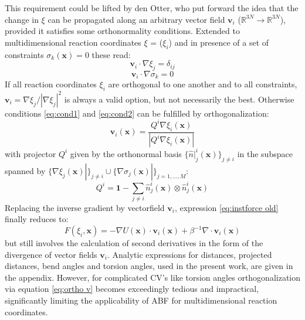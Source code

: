 This requirement could be lifted by den Otter\autocite{den2000thermodynamic}, who put forward the idea that the change in $\xi$ can be propagated along an arbitrary vector field $\textbf{v}_i$ ($\mathbb{R}^{3N} \to \mathbb{R}^{3N}$), provided it satisfies some orthonormality conditions.
Extended to multidimensional reaction coordinates \textbf{$\xi$} = ($\xi_i$) and in presence of a set of constraints $\sigma_{k}(\textbf{x})=0$ these read:\autocite{ciccotti2005blue}
\begin{equation}
  \textbf{v}_i \cdot \nabla \xi_j = \delta_{ij} \label{eq:cond1}
\end{equation}
\begin{equation}
  \textbf{v}_i \cdot \nabla \sigma_k = 0 \label{eq:cond2}
\end{equation}
If all reaction coordinates $\xi_i$ are orthogonal to one another and to all constraints, $\textbf{v}_i = \nabla \xi_j/|\nabla \xi_j|^2$ is always a valid option, but not necessarily the best.
Otherwise conditions \ref{eq:cond1} and \ref{eq:cond2} can be fulfilled by orthogonalization:\autocite{ciccotti2005blue}
\begin{equation}
  \textbf{v}_i (\textbf{x}) = \frac{Q^i \nabla \xi_i (\textbf{x})}{|Q^i \nabla \xi_i (\textbf{x})|} \label{eq:ortho v}
\end{equation}
with projector $Q^i$ given by the orthonormal basis $\{\hat{n}|_{j}^{i}(\textbf{x})\}_{j\neq i}$ in the subspace spanned by $\{\nabla \xi_j (\textbf{x})|\}_{j\neq i} \cup \{\nabla\sigma_j (\textbf{x})|\}_{j=1,...,M}$:
\begin{equation}
  Q^i = \textbf{1} - \sum_{j \neq i} \hat{n}_{j}^{i}(\textbf{x}) \otimes \hat{n}_{j}^{i}(\textbf{x})
\end{equation}
Replacing the inverse gradient by vectorfield $\textbf{v}_i$, expression \ref{eq:instforce old} finally reduces to:
\begin{equation}
  F(\xi_i,\textbf{x}) = -\nabla U(\textbf{x}) \cdot \textbf{v}_i(\textbf{x}) + \beta^{-1} \nabla \cdot \textbf{v}_i(\textbf{x}) \label{eq:inst ABF force}
\end{equation}
but still involves the calculation of second derivatives in the form of the divergence of vector fields $\textbf{v}_i$.\autocite{comer2015adaptive} Analytic expressions for distances, projected distances, bend angles and torsion angles, used in the present work, are given in the appendix. However, for complicated CV's like torsion angles orthogonalization via equation \ref{eq:ortho v} becomes exceedingly tedious and impractical, significantly limiting the applicability of ABF for multidimensional reaction coordinates.

